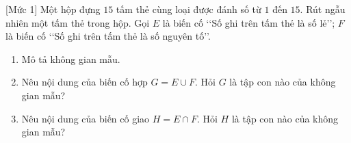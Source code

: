 \begin{bt}%
[Mức 1]
	Một hộp đựng $15$ tấm thẻ cùng loại được đánh số từ $1$ đến $15$. Rút ngẫu nhiên một tấm thẻ trong hộp. Gọi $E$ là biến cố \lq\lq Số ghi trên tấm thẻ là số lẻ\rq\rq; $F$ là biến cố \lq\lq Số ghi trên tấm thẻ là số nguyên tố\rq\rq.
	\begin{enumerate}
		\item Mô tả không gian mẫu.
		\item Nêu nội dung của biến cố hợp $G = E\cup F$. Hỏi $G$ là tập con nào của không gian mẫu?
		\item Nêu nội dung của biến cố giao $H = E\cap F$. Hỏi $H$ là tập con nào của không gian mẫu?
	\end{enumerate}
\end{bt}

